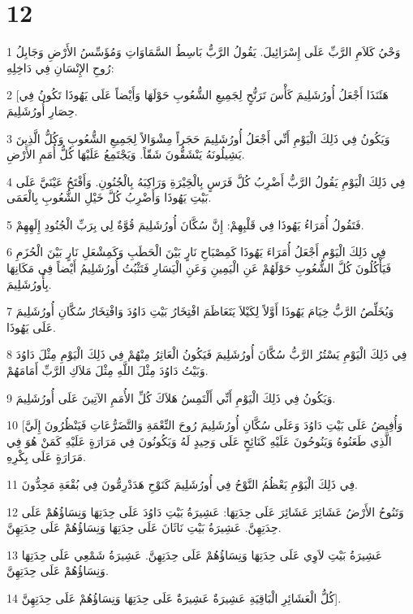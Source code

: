 \chapter{12}

\par 1 وَحْيُ كَلاَمِ الرَّبِّ عَلَى إِسْرَائِيلَ. يَقُولُ الرَّبُّ بَاسِطُ السَّمَاوَاتِ وَمُؤَسِّسُ الأَرْضِ وَجَابِلُ رُوحِ الإِنْسَانِ فِي دَاخِلِهِ:
\par 2 [هَئَنَذَا أَجْعَلُ أُورُشَلِيمَ كَأْسَ تَرَنُّحٍ لِجَمِيعِ الشُّعُوبِ حَوْلَهَا وَأَيْضاً عَلَى يَهُوذَا تَكُونُ فِي حِصَارِ أُورُشَلِيمَ.
\par 3 وَيَكُونُ فِي ذَلِكَ الْيَوْمِ أَنِّي أَجْعَلُ أُورُشَلِيمَ حَجَراً مِشْوَالاً لِجَمِيعِ الشُّعُوبِ وَكُلُّ الَّذِينَ يَشِيلُونَهُ يَنْشَقُّونَ شَقّاً. وَيَجْتَمِعُ عَلَيْهَا كُلُّ أُمَمِ الأَرْضِ.
\par 4 فِي ذَلِكَ الْيَوْمِ يَقُولُ الرَّبُّ أَضْرِبُ كُلَّ فَرَسٍ بِالْحَِيْرَةِ وَرَاكِبَهُ بِالْجُنُونِ. وَأَفْتَحُ عَيْنَيَّ عَلَى بَيْتِ يَهُوذَا وَأَضْرِبُ كُلَّ خَيْلِ الشُّعُوبِ بِالْعَمَى.
\par 5 فَتَقُولُ أُمَرَاءُ يَهُوذَا فِي قَلْبِهِمْ: إِنَّ سُكَّانَ أُورُشَلِيمَ قُوَّةٌ لِي بِرَبِّ الْجُنُودِ إِلَهِهِمْ.
\par 6 فِي ذَلِكَ الْيَوْمِ أَجْعَلُ أُمَرَاءَ يَهُوذَا كَمِصْبَاحِ نَارٍ بَيْنَ الْحَطَبِ وَكَمِشْعَلِ نَارٍ بَيْنَ الْحُزَمِ فَيَأْكُلُونَ كُلَّ الشُّعُوبِ حَوْلَهُمْ عَنِ الْيَمِينِ وَعَنِ الْيَسَارِ فَتَثْبُتُ أُورُشَلِيمُ أَيْضاً فِي مَكَانِهَا بِأُورُشَلِيمَ.
\par 7 وَيُخَلِّصُ الرَّبُّ خِيَامَ يَهُوذَا أَوَّلاً لِكَيْلاَ يَتَعَاظَمَ افْتِخَارُ بَيْتِ دَاوُدَ وَافْتِخَارُ سُكَّانِ أُورُشَلِيمَ عَلَى يَهُوذَا.
\par 8 فِي ذَلِكَ الْيَوْمِ يَسْتُرُ الرَّبُّ سُكَّانَ أُورُشَلِيمَ فَيَكُونُ الْعَاثِرُ مِنْهُمْ فِي ذَلِكَ الْيَوْمِ مِثْلَ دَاوُدَ وَبَيْتُ دَاوُدَ مِثْلَ اللَّهِ مِثْلَ مَلاَكِ الرَّبِّ أَمَامَهُمْ.
\par 9 وَيَكُونُ فِي ذَلِكَ الْيَوْمِ أَنِّي أَلْتَمِسُ هَلاَكَ كُلِّ الأُمَمِ الآتِينَ عَلَى أُورُشَلِيمَ.
\par 10 [وَأُفِيضُ عَلَى بَيْتِ دَاوُدَ وَعَلَى سُكَّانِ أُورُشَلِيمَ رُوحَ النِّعْمَةِ وَالتَّضَرُّعَاتِ فَيَنْظُرُونَ إِلَيَّ الَّذِي طَعَنُوهُ وَيَنُوحُونَ عَلَيْهِ كَنَائِحٍ عَلَى وَحِيدٍ لَهُ وَيَكُونُونَ فِي مَرَارَةٍ عَلَيْهِ كَمَنْ هُوَ فِي مَرَارَةٍ عَلَى بِكْرِهِ.
\par 11 فِي ذَلِكَ الْيَوْمِ يَعْظُمُ النَّوْحُ فِي أُورُشَلِيمَ كَنَوْحِ هَدَدْرِمُّونَ فِي بُقْعَةِ مَجِدُّونَ.
\par 12 وَتَنُوحُ الأَرْضُ عَشَائِرَ عَشَائِرَ عَلَى حِدَتِهَا: عَشِيرَةُ بَيْتِ دَاوُدَ عَلَى حِدَتِهَا وَنِسَاؤُهُمْ عَلَى حِدَتِهِنَّ. عَشِيرَةُ بَيْتِ نَاثَانَ عَلَى حِدَتِهَا وَنِسَاؤُهُمْ عَلَى حِدَتِهِنَّ.
\par 13 عَشِيرَةُ بَيْتِ لاَوِي عَلَى حِدَتِهَا وَنِسَاؤُهُمْ عَلَى حِدَتِهِنَّ. عَشِيرَةُ شَمْعِي عَلَى حِدَتِهَا وَنِسَاؤُهُمْ عَلَى حِدَتِهِنَّ.
\par 14 كُلُّ الْعَشَائِرِ الْبَاقِيَةِ عَشِيرَةٌ عَشِيرَةٌ عَلَى حِدَتِهَا وَنِسَاؤُهُمْ عَلَى حِدَتِهِنَّ].

